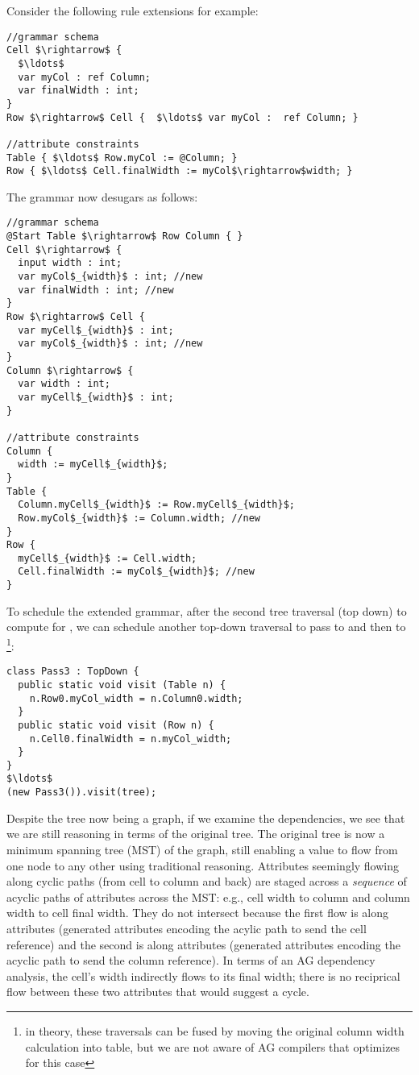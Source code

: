 Consider the following rule extensions for example:

\begin{lstlisting}[mathescape]
//grammar schema
Cell $\rightarrow$ { 
  $\ldots$ 
  var myCol : ref Column; 
  var finalWidth : int;
}
Row $\rightarrow$ Cell {  $\ldots$ var myCol :  ref Column; }

//attribute constraints
Table { $\ldots$ Row.myCol := @Column; }
Row { $\ldots$ Cell.finalWidth := myCol$\rightarrow$width; }
\end{lstlisting}

The grammar now desugars as follows:


\begin{lstlisting}[mathescape]
//grammar schema
@Start Table $\rightarrow$ Row Column { }
Cell $\rightarrow$ { 
  input width : int;
  var myCol$_{width}$ : int; //new
  var finalWidth : int; //new 
}
Row $\rightarrow$ Cell { 
  var myCell$_{width}$ : int;
  var myCol$_{width}$ : int; //new
}
Column $\rightarrow$ { 
  var width : int; 
  var myCell$_{width}$ : int;  
}

//attribute constraints
Column { 
  width := myCell$_{width}$; 
}
Table { 
  Column.myCell$_{width}$ := Row.myCell$_{width}$;
  Row.myCol$_{width}$ := Column.width; //new
}
Row { 
  myCell$_{width}$ := Cell.width;
  Cell.finalWidth := myCol$_{width}$; //new
}
\end{lstlisting}

To schedule the extended grammar, after the second tree traversal (top down) to compute  for , we can schedule another top-down traversal to pass  to  and then to  \footnote{in theory, these traversals can be fused by moving the original column width calculation into table, but we are not aware of AG compilers that optimizes for this case}:

\begin{lstlisting}[mathescape]
class Pass3 : TopDown {
  public static void visit (Table n) { 
    n.Row0.myCol_width = n.Column0.width;
  }
  public static void visit (Row n) { 
    n.Cell0.finalWidth = n.myCol_width;
  }
}
$\ldots$
(new Pass3()).visit(tree);
\end{lstlisting}

Despite the tree now being a graph, if we examine the dependencies, we see that we are still reasoning in terms of the original tree. The original tree is now a minimum spanning tree (MST) of the graph, still enabling a value to flow from one node to any other using traditional reasoning. Attributes seemingly flowing along cyclic paths (from cell to column and back) are staged across a \emph{sequence} of acyclic paths of attributes across the MST: e.g., cell width to column and column width to cell final width. They do not intersect because the first flow is along  attributes (generated attributes encoding the acylic path to send the cell reference) and the second is along  attributes (generated attributes encoding the acyclic path to send the column reference). In terms of an AG dependency analysis, the cell's width indirectly flows to its final width; there is no reciprical flow between these two attributes that would suggest a cycle.


